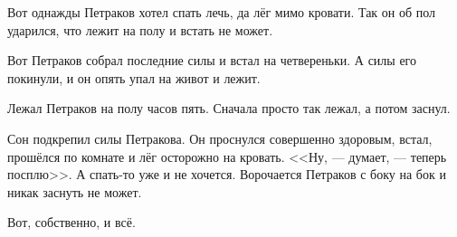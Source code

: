 Вот однажды Петраков хотел спать лечь, да лёг мимо кровати. Так он об пол ударился, что лежит на полу и встать не может.
 
Вот Петраков собрал последние силы и встал на четвереньки. А силы его покинули, и он опять упал на живот и лежит.
 
Лежал Петраков на полу часов пять. Сначала просто так лежал, а потом заснул.
 
Сон подкрепил силы Петракова. Он проснулся совершенно здоровым, встал, прошёлся по комнате и лёг осторожно на кровать. <<Ну, --- думает, --- теперь посплю>>. А спать-то уже и не хочется. Ворочается Петраков с боку на бок и никак заснуть не может.
 
Вот, собственно, и всё.